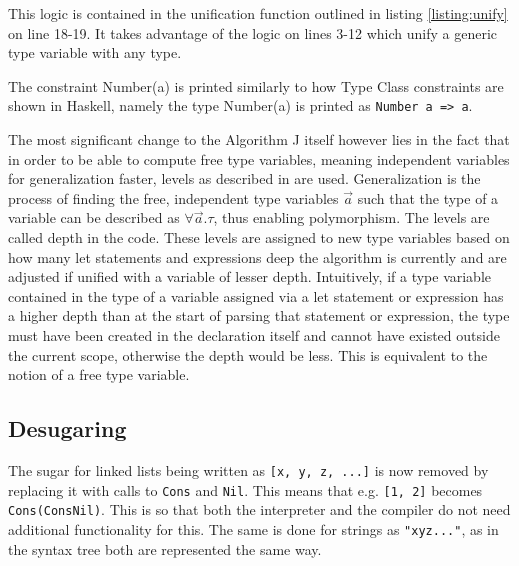 \documentclass[12pt]{article}
\newcommand{\importListing}[1]{
    \begin{minipage}{\textwidth}
    
    \end{minipage}
}
\begin{document}
\importListing{code/unify.tex}

This logic is contained in the unification function outlined
in listing \ref{listing:unify} on line 18-19. It takes advantage of the logic
on lines 3-12 which unify a generic type variable with any type.

The constraint Number(a) is printed similarly to how Type Class
constraints are shown in Haskell, namely the type Number(a) is printed as
\texttt{Number a => a}.

The most significant change to the Algorithm J itself however
lies in the fact that in order to be able
to compute free type variables, meaning independent variables for generalization
faster, levels as described in \autocite{EfficientInsightfulGeneralization2022} are
used. Generalization is the process of finding the free, independent type variables $\vec{a}$ such that the
type of a variable can be described as $\forall\vec{a}.\tau$, thus enabling polymorphism.
The levels are called depth in the code.
These levels are assigned to new type variables based on how many let statements and expressions
deep the algorithm is currently and are adjusted if unified with a variable of lesser depth.
Intuitively, if a type variable contained in the type of a variable assigned via a let statement or expression
has a higher depth than at the start of parsing that statement or expression, the type must have been created
in the declaration itself and cannot have existed outside the current scope, otherwise
the depth would be less. This is equivalent to the notion of
a free type variable.

\subsection{Desugaring}
The \gls{sugar} for linked lists being written as \texttt{[x, y, z, ...]} is now
removed by replacing it with calls to \texttt{Cons} and \texttt{Nil}. This means that e.g.
\texttt{[1, 2]} becomes \texttt{Cons\;(Cons\;Nil)}. This is so that both the interpreter and
the compiler do not need additional functionality for this. The same is done
for strings as \texttt{"xyz..."}, as in the syntax tree both are represented
the same way.
\end{document}
